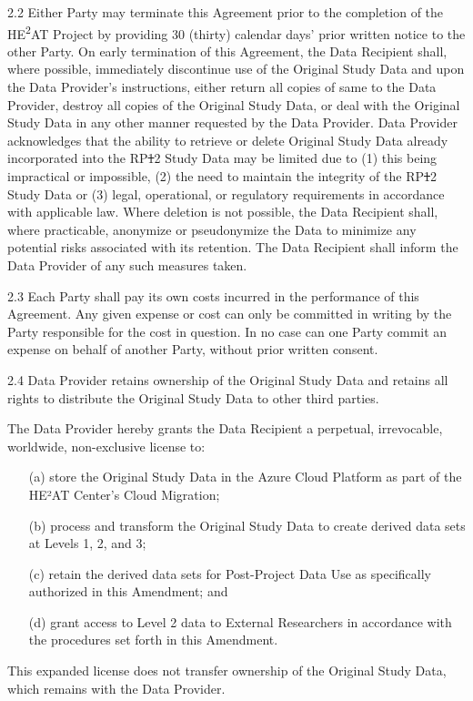 \documentclass[12pt,letterpaper]{article}
\newcommand{\deleted}[1]{\textcolor{deletecolor}{\sout{#1}}}
\newcommand{\added}[1]{\textcolor{addcolor}{#1}}
\begin{document}
2.2 Either Party may terminate this Agreement prior to the completion of the HE\textsuperscript{2}AT Project by providing 30 (thirty) calendar days' prior written notice to the other Party. On early termination of this Agreement, the Data Recipient shall, where possible, immediately discontinue use of the Original Study Data and upon the Data Provider's instructions, either return all copies of same to the Data Provider, destroy all copies of the Original Study Data, or deal with the Original Study Data in any other manner requested by the Data Provider. Data Provider acknowledges that the ability to retrieve or delete Original Study Data already incorporated into the RP\deleted{1}\added{2} Study Data may be limited due to (1) this being impractical or impossible, (2) the need to maintain the integrity of the RP\deleted{1}\added{2} Study Data or (3) legal, operational, or regulatory requirements in accordance with applicable law. Where deletion is not possible, the Data Recipient shall, where practicable, anonymize or pseudonymize the Data to minimize any potential risks associated with its retention. The Data Recipient shall inform the Data Provider of any such measures taken.

2.3 Each Party shall pay its own costs incurred in the performance of this Agreement. Any given expense or cost can only be committed in writing by the Party responsible for the cost in question. In no case can one Party commit an expense on behalf of another Party, without prior written consent.

2.4 Data Provider retains ownership of the Original Study Data and retains all rights to distribute the Original Study Data to other third parties. 

\textcolor{addcolor}{The Data Provider hereby grants the Data Recipient a perpetual, irrevocable, worldwide, non-exclusive license to:
\begin{itemize}
\item[(a)] store the Original Study Data in the Azure Cloud Platform as part of the HE²AT Center's Cloud Migration;
\item[(b)] process and transform the Original Study Data to create derived data sets at Levels 1, 2, and 3;
\item[(c)] retain the derived data sets for Post-Project Data Use as specifically authorized in this Amendment; and
\item[(d)] grant access to Level 2 data to External Researchers in accordance with the procedures set forth in this Amendment.
\end{itemize}

This expanded license does not transfer ownership of the Original Study Data, which remains with the Data Provider.}
\end{document}
